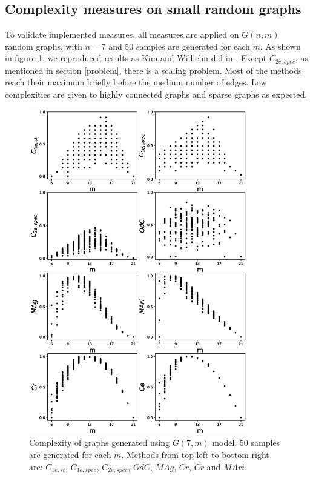 \documentclass[12pt]{article}
\begin{document}
\subsection{Complexity measures on small random graphs}
\label{complexity}
To validate implemented measures, all measures are applied on $G(n,m)$ random graphs, with $n=7$ and 50 samples are generated for each $m$. As shown in figure \ref{fig:small_graphs}, we reproduced results as Kim and Wilhelm did in \cite{KIM20082637}. Except $C_{2e,spec}$, as mentioned in section \ref{problem}, there is a scaling problem. Most of the methods reach their maximum briefly before the medium number of edges. Low complexities are given to highly connected graphs and sparse graphs as expected.\par
\clearpage
\newpage
\begin{figure}[p!]
    \includegraphics[width=0.85\textwidth]{complexities.eps}
    \vspace*{-0.8in}
    \centering
    \caption{Complexity of graphs generated using $G(7,m)$ model, 50 samples are generated for each $m$. Methods from top-left to bottom-right are: $C_{1e,st}$, $C_{1e,spec}$, $C_{2e,spec}$, $OdC$, $MAg$, $Cr$, $Cr$ and $MAri$.}
    \label{fig:small_graphs}
    \clearpage
\end{figure}
\end{document}
